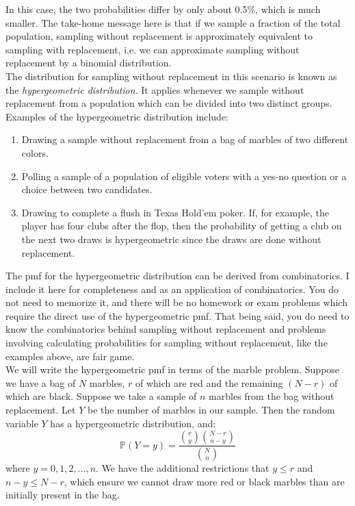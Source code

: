 \documentclass[12pt]{article}
\theoremstyle{definition}
\theoremstyle{remark}
\def\P{{\mathbb P}}
\begin{document}
In this case, the two probabilities differ by only about 0.5\%, which is much smaller. The take-home message here is that if we sample a fraction of the total population, sampling without replacement is approximately equivalent to sampling with replacement, i.e. we can approximate sampling without replacement by a binomial distribution.\\

The distribution for sampling without replacement in this scenario is known as the \emph{hypergeometric distribution}. It applies whenever we sample without replacement from a population which can be divided into two distinct groups. Examples of the hypergeometric distribution include:
\begin{enumerate}
\item Drawing a sample without replacement from a bag of marbles of two different colors.
\item Polling a sample of a population of eligible voters with a yes-no question or a choice between two candidates.
\item Drawing to complete a flush in Texas Hold'em poker. If, for example, the player has four clubs after the flop, then the probability of getting a club on the next two draws is hypergeometric since the draws are done without replacement.
\end{enumerate}

The pmf for the hypergeometric distribution can be derived from combinatorics. I include it here for completeness and as an application of combinatorics. You do not need to memorize it, and there will be no homework or exam problems which require the direct use of the hypergeometric pmf. That being said, you do need to know the combinatorics behind sampling without replacement and problems involving calculating probabilities for sampling without replacement, like the examples above, are fair game.\\

We will write the hypergeometric pmf in terms of the marble problem. Suppose we have a bag of $N$ marbles, $r$
of which are red and the remaining $(N - r)$ of which are black. Suppose we take a sample of $n$ marbles from the bag without replacement. Let $Y$ be the number of marbles in our sample. Then the random variable $Y$ has a hypergeometric distribution, and:
\[
\P(Y = y) = \frac{ \binom{r}{y} \binom{N-r}{n-y} }{ \binom{N}{n} }
\]
where $y = 0, 1, 2, \dots, n$. We have the additional restrictions that $y \leq r$ and $n - y \leq N - r$, which ensure we cannot draw more red or black marbles than are initially present in the bag.\\
\end{document}
